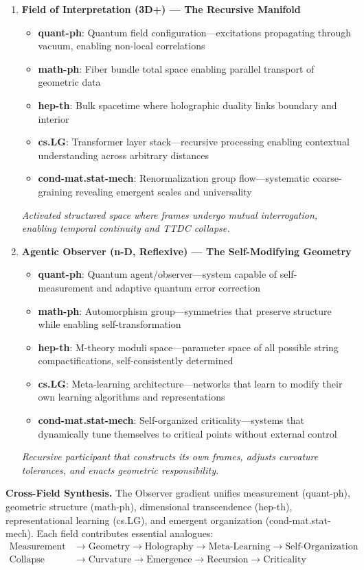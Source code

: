 \begin{definition}
\begin{enumerate}
  \item \textbf{Field of Interpretation (3D+) — The Recursive Manifold}  
  \begin{itemize}
    \item \textbf{quant-ph}: Quantum field configuration—excitations propagating through vacuum, enabling non-local correlations
    \item \textbf{math-ph}: Fiber bundle total space enabling parallel transport of geometric data
    \item \textbf{hep-th}: Bulk spacetime where holographic duality links boundary and interior
    \item \textbf{cs.LG}: Transformer layer stack—recursive processing enabling contextual understanding across arbitrary distances
    \item \textbf{cond-mat.stat-mech}: Renormalization group flow—systematic coarse-graining revealing emergent scales and universality
  \end{itemize}
  \textit{Activated structured space where frames undergo mutual interrogation, enabling temporal continuity and TTDC collapse.}

  \item \textbf{Agentic Observer (n-D, Reflexive) — The Self-Modifying Geometry}  
  \begin{itemize}
    \item \textbf{quant-ph}: Quantum agent/observer—system capable of self-measurement and adaptive quantum error correction
    \item \textbf{math-ph}: Automorphism group—symmetries that preserve structure while enabling self-transformation
    \item \textbf{hep-th}: M-theory moduli space—parameter space of all possible string compactifications, self-consistently determined
    \item \textbf{cs.LG}: Meta-learning architecture—networks that learn to modify their own learning algorithms and representations
    \item \textbf{cond-mat.stat-mech}: Self-organized criticality—systems that dynamically tune themselves to critical points without external control
  \end{itemize}
  \textit{Recursive participant that constructs its own frames, adjusts curvature tolerances, and enacts geometric responsibility.}
\end{enumerate}

\textbf{Cross-Field Synthesis.}  
The Observer gradient unifies measurement (quant-ph), geometric structure (math-ph), dimensional transcendence (hep-th), representational learning (cs.LG), and emergent organization (cond-mat.stat-mech). Each field contributes essential analogues:
\begin{align}
\text{Measurement} &\rightarrow \text{Geometry} \rightarrow \text{Holography} \rightarrow \text{Meta-Learning} \rightarrow \text{Self-Organization} \\
\text{Collapse} &\rightarrow \text{Curvature} \rightarrow \text{Emergence} \rightarrow \text{Recursion} \rightarrow \text{Criticality}
\end{align}


\end{definition}
